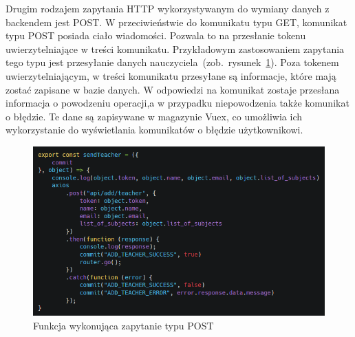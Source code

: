 Drugim rodzajem zapytania HTTP wykorzystywanym do wymiany danych z backendem jest POST. W przeciwieństwie do komunikatu typu GET, komunikat typu POST posiada ciało wiadomości. Pozwala to na przesłanie tokenu uwierzytelniające w treści komunikatu. Przykładowym zastosowaniem zapytania tego typu jest przesyłanie danych nauczyciela~(zob.~rysunek~\ref{rys:post}). Poza tokenem uwierzytelniającym, w treści komunikatu przesyłane są informacje, które mają zostać zapisane w bazie danych. W odpowiedzi na komunikat zostaje przesłana informacja o powodzeniu operacji,a w przypadku niepowodzenia także komunikat o błędzie. Te dane są zapisywane w magazynie Vuex, co umożliwia ich wykorzystanie do wyświetlania komunikatów o błędzie użytkownikowi.
\begin{figure}[h]
\centering\includegraphics[width=\textwidth]{figures/post}
\caption{Funkcja wykonująca zapytanie typu POST}\label{rys:post}
\end{figure}




